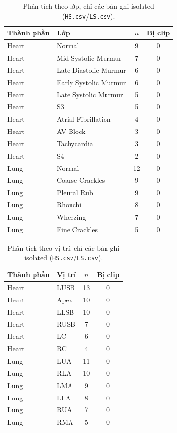\documentclass[11pt]{article}
\begin{document}
\begin{table}[H]
\centering
\caption{Phân tích theo lớp, chỉ các bản ghi isolated (\texttt{HS.csv}/\texttt{LS.csv}).}
\label{tab:perclass}
\begin{tabular}{@{}llc c@{}}
\toprule
Thành phần & Lớp & $n$ & Bị clip \\
\midrule
Heart & Normal                 & 9  & 0 \\
Heart & Mid Systolic Murmur    & 7  & 0 \\
Heart & Late Diastolic Murmur  & 6  & 0 \\
Heart & Early Systolic Murmur  & 6  & 0 \\
Heart & Late Systolic Murmur   & 5  & 0 \\
Heart & S3                     & 5  & 0 \\
Heart & Atrial Fibrillation    & 4  & 0 \\
Heart & AV Block               & 3  & 0 \\
Heart & Tachycardia            & 3  & 0 \\
Heart & S4                     & 2  & 0 \\
\addlinespace
Lung  & Normal            & 12 & 0 \\
Lung  & Coarse Crackles   & 9  & 0 \\
Lung  & Pleural Rub       & 9  & 0 \\
Lung  & Rhonchi           & 8  & 0 \\
Lung  & Wheezing          & 7  & 0 \\
Lung  & Fine Crackles     & 5  & 0 \\
\bottomrule
\end{tabular}
\end{table}

\begin{table}[H]
\centering
\caption{Phân tích theo vị trí, chỉ các bản ghi isolated (\texttt{HS.csv}/\texttt{LS.csv}).}
\label{tab:perlocation}
\begin{tabular}{@{}llc c@{}}
\toprule
Thành phần & Vị trí & $n$ & Bị clip \\
\midrule
Heart & LUSB & 13 & 0 \\
Heart & Apex & 10 & 0 \\
Heart & LLSB & 10 & 0 \\
Heart & RUSB & 7  & 0 \\
Heart & LC   & 6  & 0 \\
Heart & RC   & 4  & 0 \\
\addlinespace
Lung  & LUA & 11 & 0 \\
Lung  & RLA & 10 & 0 \\
Lung  & LMA & 9  & 0 \\
Lung  & LLA & 8  & 0 \\
Lung  & RUA & 7  & 0 \\
Lung  & RMA & 5  & 0 \\
\bottomrule
\end{tabular}
\end{table}
\end{document}
